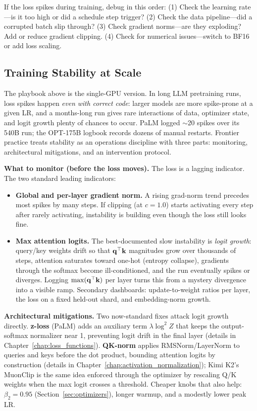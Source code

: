 \begin{warningbox}
If the loss spikes during training, debug in this order: (1) Check the learning rate---is it too high or did a schedule step trigger? (2) Check the data pipeline---did a corrupted batch slip through? (3) Check gradient norms---are they exploding? Add or reduce gradient clipping. (4) Check for numerical issues---switch to BF16 or add loss scaling.
\end{warningbox}

\subsection{Training Stability at Scale}
\label{subsec:stability_at_scale}

The playbook above is the single-GPU version. In long LLM pretraining runs, loss spikes happen \emph{even with correct code}: larger models are more spike-prone at a given LR, and a months-long run gives rare interactions of data, optimizer state, and logit growth plenty of chances to occur. PaLM logged $\sim$20 spikes over its 540B run; the OPT-175B logbook records dozens of manual restarts. Frontier practice treats stability as an operations discipline with three parts: monitoring, architectural mitigations, and an intervention protocol.

\textbf{What to monitor (before the loss moves).} The loss is a lagging indicator. The two standard leading indicators:
\begin{itemize}
    \item \textbf{Global and per-layer gradient norm.} A rising grad-norm trend precedes most spikes by many steps. If clipping (at $c = 1.0$) starts activating every step after rarely activating, instability is building even though the loss still looks fine.
    \item \textbf{Max attention logits.} The best-documented slow instability is \emph{logit growth}: query/key weights drift so that $\mathbf{q}^\top \mathbf{k}$ magnitudes grow over thousands of steps, attention saturates toward one-hot (entropy collapse), gradients through the softmax become ill-conditioned, and the run eventually spikes or diverges. Logging $\max(\mathbf{q}^\top \mathbf{k})$ per layer turns this from a mystery divergence into a visible ramp. Secondary dashboards: update-to-weight ratios per layer, the loss on a fixed held-out shard, and embedding-norm growth.
\end{itemize}

\textbf{Architectural mitigations.} Two now-standard fixes attack logit growth directly. \textbf{z-loss} (PaLM) adds an auxiliary term $\lambda \log^2 Z$ that keeps the output-softmax normalizer near 1, preventing logit drift in the final layer (details in Chapter~\ref{chap:loss_functions}). \textbf{QK-norm} applies RMSNorm/LayerNorm to queries and keys before the dot product, bounding attention logits by construction (details in Chapter~\ref{chap:activation_normalization}); Kimi K2's MuonClip is the same idea enforced through the optimizer by rescaling Q/K weights when the max logit crosses a threshold. Cheaper knobs that also help: $\beta_2 = 0.95$ (Section~\ref{sec:optimizers}), longer warmup, and a modestly lower peak LR.

